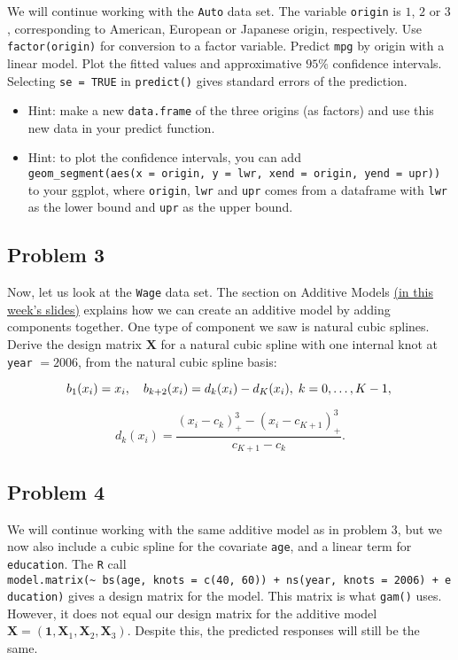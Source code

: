 \documentclass[
]{article}
\begin{document}
We will continue working with the \texttt{Auto} data set. The variable
\texttt{origin} is \(1\), \(2\) or \(3\), corresponding to American,
European or Japanese origin, respectively. Use \texttt{factor(origin)}
for conversion to a factor variable. Predict \texttt{mpg} by origin with
a linear model. Plot the fitted values and approximative \(95\%\)
confidence intervals. Selecting \texttt{se\ =\ TRUE} in
\texttt{predict()} gives standard errors of the prediction.

\begin{itemize}
\item
  Hint: make a new \texttt{data.frame} of the three origins (as factors)
  and use this new data in your predict function.
\item
  Hint: to plot the confidence intervals, you can add
  \texttt{geom\_segment(aes(x\ =\ origin,\ y\ =\ lwr,\ xend\ =\ origin,\ yend\ =\ upr))}
  to your ggplot, where \texttt{origin}, \texttt{lwr} and \texttt{upr}
  comes from a dataframe with \texttt{lwr} as the lower bound and
  \texttt{upr} as the upper bound.
\end{itemize}

\subsection{Problem 3}\label{problem-3}

Now, let us look at the \texttt{Wage} data set. The section on Additive
Models
\href{https://github.com/stefaniemuff/statlearning2/blob/master/7BeyondLinear/7BeyondLinear_2024.pdf}{(in
this week's slides)} explains how we can create an additive model by
adding components together. One type of component we saw is natural
cubic splines. Derive the design matrix \(\mathbf{X}\) for a natural
cubic spline with one internal knot at \texttt{year} \(= 2006\), from
the natural cubic spline basis:

\[
b_1(x_i) = x_i, \quad b_{k+2}(x_i) = d_k(x_i)-d_K(x_i),\; k = 0, \ldots, K - 1,\\
\]

\[
d_k(x_i) = \frac{(x_i-c_k)^3_+-(x_i-c_{K+1})^3_+}{c_{K+1}-c_k}.
\]

\subsection{Problem 4}\label{problem-4}

We will continue working with the same additive model as in problem 3,
but we now also include a cubic spline for the covariate \texttt{age},
and a linear term for \texttt{education}. The \texttt{R} call
\texttt{model.matrix(\textasciitilde{}\ bs(age,\ knots\ =\ c(40,\ 60))\ +\ ns(year,\ knots\ =\ 2006)\ +\ education)}
gives a design matrix for the model. This matrix is what \texttt{gam()}
uses. However, it does not equal our design matrix for the additive
model
\(\mathbf X = (\mathbf{1}, \mathbf{X}_1, \mathbf{X}_2, \mathbf{X}_3)\).
Despite this, the predicted responses will still be the same.
\end{document}
